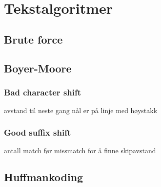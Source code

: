 \section{\color{red}Tekstalgoritmer}
\subsection{\color{red}Brute force}
\subsection{\color{red}Boyer-Moore}
\subsubsection{\color{red}Bad character shift}
avstand til neste gang nål er på linje med høystakk
\subsubsection{\color{red}Good suffix shift}
antall match før missmatch for å finne skipavstand
\subsection{\color{red}Huffmankoding}
\label{huffman}